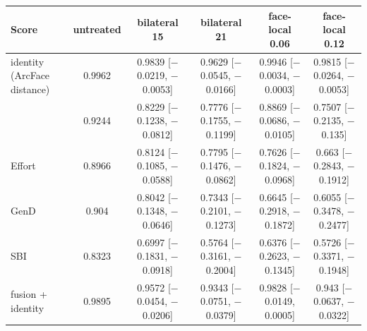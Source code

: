 \begin{tabular}{@{}l ccccc@{}}
\toprule
Score & untreated & bilateral 15 & bilateral 21 & face-local 0.06 & face-local 0.12 \\
\midrule
identity (ArcFace distance) & 0.9962 & 0.9839 [$-$0.0219, $-$0.0053] & 0.9629 [$-$0.0545, $-$0.0166] & 0.9946 [$-$0.0034, $-$0.0003] & 0.9815 [$-$0.0264, $-$0.0053] \\
\oursB{} & 0.9244 & 0.8229 [$-$0.1238, $-$0.0812] & 0.7776 [$-$0.1755, $-$0.1199] & 0.8869 [$-$0.0686, $-$0.0105] & 0.7507 [$-$0.2135, $-$0.135] \\
Effort & 0.8966 & 0.8124 [$-$0.1085, $-$0.0588] & 0.7795 [$-$0.1476, $-$0.0862] & 0.7626 [$-$0.1824, $-$0.0968] & 0.663 [$-$0.2843, $-$0.1912] \\
GenD & 0.904 & 0.8042 [$-$0.1348, $-$0.0646] & 0.7343 [$-$0.2101, $-$0.1273] & 0.6645 [$-$0.2918, $-$0.1872] & 0.6055 [$-$0.3478, $-$0.2477] \\
SBI & 0.8323 & 0.6997 [$-$0.1831, $-$0.0918] & 0.5764 [$-$0.3161, $-$0.2004] & 0.6376 [$-$0.2623, $-$0.1345] & 0.5726 [$-$0.3371, $-$0.1948] \\
fusion \oursB{} + identity & 0.9895 & 0.9572 [$-$0.0454, $-$0.0206] & 0.9343 [$-$0.0751, $-$0.0379] & 0.9828 [$-$0.0149, 0.0005] & 0.943 [$-$0.0637, $-$0.0322] \\
\bottomrule
\end{tabular}

